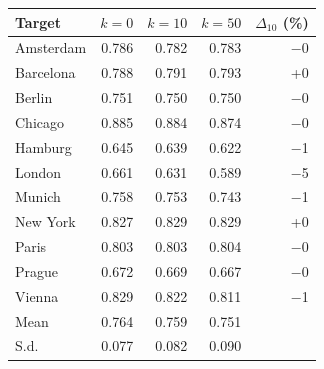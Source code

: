 \begin{tabular}{lrrrr}
\toprule
Target & $k{=}0$ & $k{=}10$ & $k{=}50$ & $\Delta_{10}$ (\%) \\
\midrule
Amsterdam & 0.786 & 0.782 & 0.783 & \ensuremath{-}0 \\
Barcelona & 0.788 & 0.791 & 0.793 & +0 \\
Berlin & 0.751 & 0.750 & 0.750 & \ensuremath{-}0 \\
Chicago & 0.885 & 0.884 & 0.874 & \ensuremath{-}0 \\
Hamburg & 0.645 & 0.639 & 0.622 & \ensuremath{-}1 \\
London & 0.661 & 0.631 & 0.589 & \ensuremath{-}5 \\
Munich & 0.758 & 0.753 & 0.743 & \ensuremath{-}1 \\
New York & 0.827 & 0.829 & 0.829 & +0 \\
Paris & 0.803 & 0.803 & 0.804 & \ensuremath{-}0 \\
Prague & 0.672 & 0.669 & 0.667 & \ensuremath{-}0 \\
Vienna & 0.829 & 0.822 & 0.811 & \ensuremath{-}1 \\
\midrule
Mean & 0.764 & 0.759 & 0.751 & \\
S.d. & 0.077 & 0.082 & 0.090 & \\
\bottomrule
\end{tabular}
